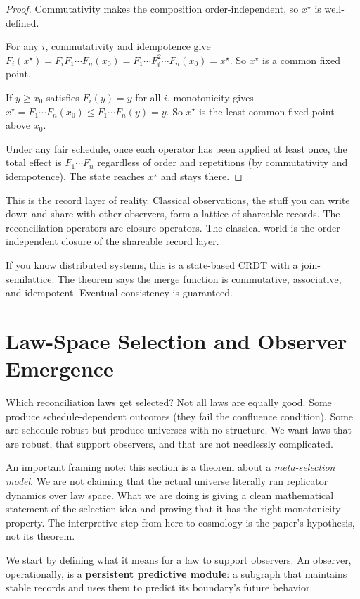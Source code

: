 \documentclass[11pt]{article}
\begin{document}
\begin{proof}
Commutativity makes the composition order-independent, so $x^\star$ is well-defined.

For any $i$, commutativity and idempotence give $F_i(x^\star) = F_i F_1\cdots F_n(x_0) = F_1\cdots F_i^2\cdots F_n(x_0) = x^\star$. So $x^\star$ is a common fixed point.

If $y\ge x_0$ satisfies $F_i(y)=y$ for all $i$, monotonicity gives $x^\star = F_1\cdots F_n(x_0) \le F_1\cdots F_n(y) = y$. So $x^\star$ is the least common fixed point above $x_0$.

Under any fair schedule, once each operator has been applied at least once, the total effect is $F_1\cdots F_n$ regardless of order and repetitions (by commutativity and idempotence). The state reaches $x^\star$ and stays there.
\end{proof}

This is the record layer of reality. Classical observations, the stuff you can write down and share with other observers, form a lattice of shareable records. The reconciliation operators are closure operators. The classical world is the order-independent closure of the shareable record layer.

If you know distributed systems, this is a state-based CRDT with a join-semilattice. The theorem says the merge function is commutative, associative, and idempotent. Eventual consistency is guaranteed.


\section{Law-Space Selection and Observer Emergence}

Which reconciliation laws get selected? Not all laws are equally good. Some produce schedule-dependent outcomes (they fail the confluence condition). Some are schedule-robust but produce universes with no structure. We want laws that are robust, that support observers, and that are not needlessly complicated.

An important framing note: this section is a theorem about a \emph{meta-selection model}. We are not claiming that the actual universe literally ran replicator dynamics over law space. What we are doing is giving a clean mathematical statement of the selection idea and proving that it has the right monotonicity property. The interpretive step from here to cosmology is the paper's hypothesis, not its theorem.

We start by defining what it means for a law to support observers. An observer, operationally, is a \textbf{persistent predictive module}: a subgraph that maintains stable records and uses them to predict its boundary's future behavior.
\end{document}
